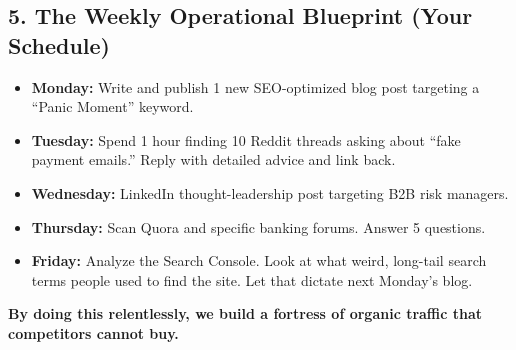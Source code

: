 \documentclass[11pt, letterpaper]{article}
\begin{document}
\subsection*{5. The Weekly Operational Blueprint (Your Schedule)}

\begin{itemize}
    \item \textbf{Monday:} Write and publish 1 new SEO-optimized blog post targeting a ``Panic Moment'' keyword.
    \item \textbf{Tuesday:} Spend 1 hour finding 10 Reddit threads asking about ``fake payment emails.'' Reply with detailed advice and link back.
    \item \textbf{Wednesday:} LinkedIn thought-leadership post targeting B2B risk managers.
    \item \textbf{Thursday:} Scan Quora and specific banking forums. Answer 5 questions.
    \item \textbf{Friday:} Analyze the Search Console. Look at what weird, long-tail search terms people used to find the site. Let that dictate next Monday's blog.
\end{itemize}

\textbf{By doing this relentlessly, we build a fortress of organic traffic that competitors cannot buy.}
\end{document}
